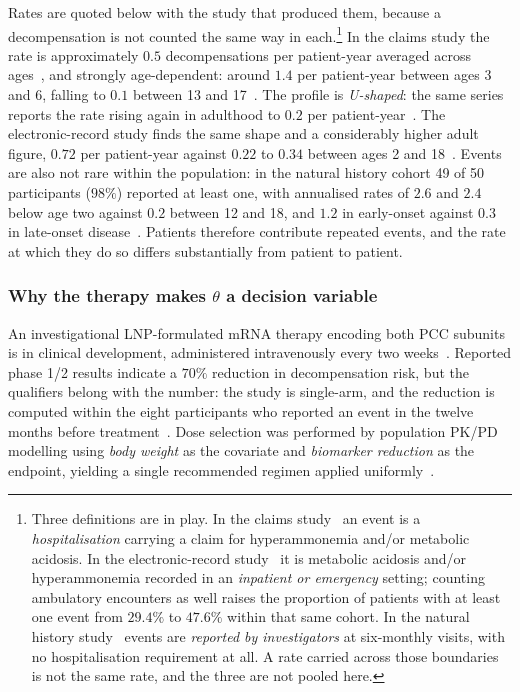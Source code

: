 Rates are quoted below with the study that produced them, because a decompensation is not
counted the same way in each.\footnote{%
\label{fn:mde}%
Three definitions are in play. In the claims study~\cite{mde_claims_us} an event is a
\emph{hospitalisation} carrying a claim for hyperammonemia and/or metabolic acidosis. In
the electronic-record study~\cite{mde_emr_us} it is metabolic acidosis and/or
hyperammonemia recorded in an \emph{inpatient or emergency} setting; counting ambulatory
encounters as well raises the proportion of patients with at least one event from $29.4\%$
to $47.6\%$ within that same cohort. In the natural history study~\cite{natural_history}
events are \emph{reported by investigators} at six-monthly visits, with no hospitalisation
requirement at all. A rate carried across those boundaries is not the same rate, and the
three are not pooled here. %
}
In the claims study the rate is approximately $0.5$ decompensations per patient-year
averaged across ages~\cite{mde_claims_us}, %
and strongly age-dependent: around $1.4$ per patient-year between ages 3 and 6, falling to
$0.1$ between 13 and 17~\cite{mde_claims_us}. %
The profile is \emph{U-shaped}: the same series reports the rate rising again in adulthood
to $0.2$ per patient-year~\cite{mde_claims_us}. %
The electronic-record study finds the same shape and a considerably higher adult figure,
$0.72$ per patient-year against $0.22$ to $0.34$ between ages 2 and
18~\cite{mde_emr_us}. %
Events are also not rare within the population: in the natural history cohort 49 of 50
participants ($98\%$) reported at least one, with annualised rates of $2.6$ and $2.4$ below
age two against $0.2$ between 12 and 18, and $1.2$ in early-onset against $0.3$ in
late-onset disease~\cite{natural_history}. %
Patients therefore contribute repeated events, and the rate at which they do so differs
substantially from patient to patient.

\subsubsection{Why the therapy makes $\theta$ a decision variable}

An investigational LNP-formulated mRNA therapy encoding both PCC subunits is in clinical
development, administered intravenously every two weeks~\cite{trial_phase12}. %
Reported phase 1/2 results indicate a $70\%$ reduction in decompensation risk, but the
qualifiers belong with the number: the study is single-arm, and the reduction is computed
within the eight participants who reported an event in the twelve months before
treatment~\cite{trial_phase12}. %
Dose selection was performed by population PK/PD modelling using \emph{body weight} as the
covariate and \emph{biomarker reduction} as the endpoint, yielding a single recommended
regimen applied uniformly~\cite{dose_selection_poster,pkpd_translational}. %

